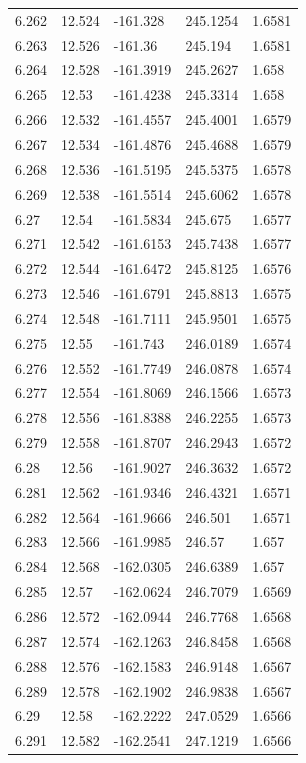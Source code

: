 \begin{tabular}{lllll}
6.262 & 12.524 & -161.328 & 245.1254 & 1.6581 \\
6.263 & 12.526 & -161.36 & 245.194 & 1.6581 \\
6.264 & 12.528 & -161.3919 & 245.2627 & 1.658 \\
6.265 & 12.53 & -161.4238 & 245.3314 & 1.658 \\
6.266 & 12.532 & -161.4557 & 245.4001 & 1.6579 \\
6.267 & 12.534 & -161.4876 & 245.4688 & 1.6579 \\
6.268 & 12.536 & -161.5195 & 245.5375 & 1.6578 \\
6.269 & 12.538 & -161.5514 & 245.6062 & 1.6578 \\
6.27 & 12.54 & -161.5834 & 245.675 & 1.6577 \\
6.271 & 12.542 & -161.6153 & 245.7438 & 1.6577 \\
6.272 & 12.544 & -161.6472 & 245.8125 & 1.6576 \\
6.273 & 12.546 & -161.6791 & 245.8813 & 1.6575 \\
6.274 & 12.548 & -161.7111 & 245.9501 & 1.6575 \\
6.275 & 12.55 & -161.743 & 246.0189 & 1.6574 \\
6.276 & 12.552 & -161.7749 & 246.0878 & 1.6574 \\
6.277 & 12.554 & -161.8069 & 246.1566 & 1.6573 \\
6.278 & 12.556 & -161.8388 & 246.2255 & 1.6573 \\
6.279 & 12.558 & -161.8707 & 246.2943 & 1.6572 \\
6.28 & 12.56 & -161.9027 & 246.3632 & 1.6572 \\
6.281 & 12.562 & -161.9346 & 246.4321 & 1.6571 \\
6.282 & 12.564 & -161.9666 & 246.501 & 1.6571 \\
6.283 & 12.566 & -161.9985 & 246.57 & 1.657 \\
6.284 & 12.568 & -162.0305 & 246.6389 & 1.657 \\
6.285 & 12.57 & -162.0624 & 246.7079 & 1.6569 \\
6.286 & 12.572 & -162.0944 & 246.7768 & 1.6568 \\
6.287 & 12.574 & -162.1263 & 246.8458 & 1.6568 \\
6.288 & 12.576 & -162.1583 & 246.9148 & 1.6567 \\
6.289 & 12.578 & -162.1902 & 246.9838 & 1.6567 \\
6.29 & 12.58 & -162.2222 & 247.0529 & 1.6566 \\
6.291 & 12.582 & -162.2541 & 247.1219 & 1.6566 \\

\end{tabular}
